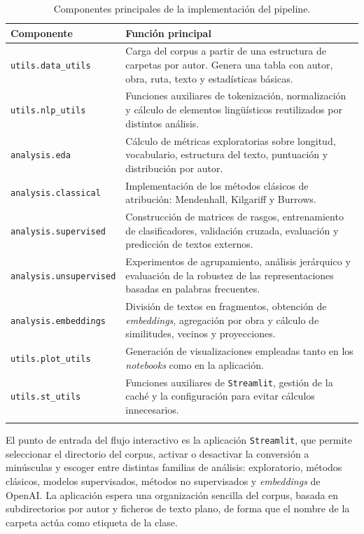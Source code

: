 \documentclass[IB]{TFUOC}%
\begin{document}
\begin{longtable}{|p{4.5cm}|p{10cm}|}
\hline
\textbf{Componente} & \textbf{Función principal} \\
\hline

\texttt{utils.data\_utils} & Carga del corpus a partir de una estructura de carpetas por autor. Genera una tabla con autor, obra, ruta, texto y estadísticas básicas. \\
\hline

\texttt{utils.nlp\_utils} & Funciones auxiliares de tokenización, normalización y cálculo de elementos lingüísticos reutilizados por distintos análisis. \\
\hline

\texttt{analysis.eda} & Cálculo de métricas exploratorias sobre longitud, vocabulario, estructura del texto, puntuación y distribución por autor. \\
\hline

\texttt{analysis.classical} & Implementación de los métodos clásicos de atribución: Mendenhall, Kilgariff y Burrows. \\
\hline

\texttt{analysis.supervised} & Construcción de matrices de rasgos, entrenamiento de clasificadores, validación cruzada, evaluación y predicción de textos externos. \\
\hline

\texttt{analysis.unsupervised} & Experimentos de agrupamiento, análisis jerárquico y evaluación de la robustez de las representaciones basadas en palabras frecuentes. \\
\hline

\texttt{analysis.embeddings} & División de textos en fragmentos, obtención de \textit{embeddings}, agregación por obra y cálculo de similitudes, vecinos y proyecciones. \\
\hline

\texttt{utils.plot\_utils} & Generación de visualizaciones empleadas tanto en los \textit{notebooks} como en la aplicación. \\
\hline

\texttt{utils.st\_utils} & Funciones auxiliares de \texttt{Streamlit}, gestión de la caché y la configuración para evitar cálculos innecesarios. \\
\hline
\caption{Componentes principales de la implementación del pipeline.}
\label{tab:pipeline_componentes}
\end{longtable}

El punto de entrada del flujo interactivo es la aplicación \texttt{Streamlit}, que permite seleccionar el directorio del corpus, activar o desactivar la conversión a minúsculas y escoger entre distintas familias de análisis: exploratorio, métodos clásicos, modelos supervisados, métodos no supervisados y \textit{embeddings} de OpenAI. La aplicación espera una organización sencilla del corpus, basada en subdirectorios por autor y ficheros de texto plano, de forma que el nombre de la carpeta actúa como etiqueta de la clase.
\end{document}
